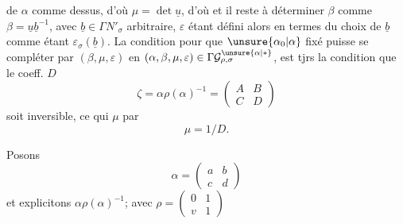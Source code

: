 de $\alpha$ comme dessus, d'où $\mu=\det\underline u$, d'où
et il  
reste à déterminer $\beta$ comme
$\beta=\underline u\underline b^{-1}$, avec $\underline b\in\Gamma N'_\sigma$
arbitraire, $\varepsilon$ étant défini alors en termes du choix de $\underline b$
comme étant $\varepsilon_\sigma(\underline b)$. La condition pour que
$\unsure{\alpha_0|\alpha}$ fixé puisse se compléter par $(\beta,\mu,\varepsilon)$
en $(\alpha,\beta,\mu,\varepsilon)\in\Gamma\mathcal G^{\unsure{\alpha|*}}_{\rho,\sigma}$,
est tjrs la condition que le coeff. $D$ 
\[
\tag{33}
\zeta=\alpha\rho(\alpha)^{-1}=\begin{pmatrix}A&B\\C&D\end{pmatrix}
\]
soit inversible, ce qui   $\mu$ par
\[
\tag{34}
\mu=1/D.
\]

Posons
\[
\tag{35}
\alpha=\begin{pmatrix}a&b\\c&d\end{pmatrix}
\]
et explicitons $\alpha\rho(\alpha)^{-1}$; avec
$\rho=\begin{pmatrix}0&1\\v&1\end{pmatrix}$

